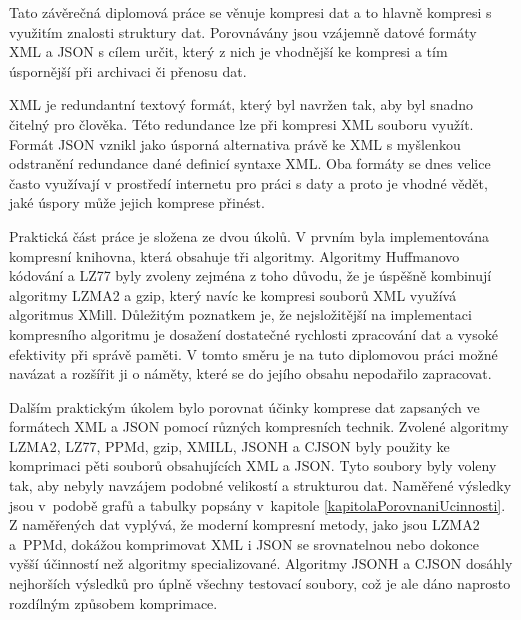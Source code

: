 

Tato závěrečná diplomová práce se věnuje kompresi dat a to hlavně kompresi s využitím znalosti struktury dat. Porovnávány jsou vzájemně datové formáty XML a JSON s cílem určit, který z nich je vhodnější ke kompresi a tím úspornější při archivaci či přenosu dat.

XML je redundantní textový formát, který byl navržen tak, aby byl snadno čitelný pro člověka. Této redundance lze při kompresi XML souboru využít. Formát JSON vznikl jako úsporná alternativa právě ke XML s myšlenkou odstranění redundance dané definicí syntaxe XML. Oba formáty se dnes velice často využívají v prostředí internetu pro práci s daty a proto je vhodné vědět, jaké úspory může jejich komprese přinést.

Praktická část práce je složena ze dvou úkolů. V prvním byla implementována kompresní knihovna, která obsahuje tři algoritmy. Algoritmy Huffmanovo kódování a LZ77 byly zvoleny zejména z toho důvodu, že je úspěšně kombinují algoritmy LZMA2 a gzip, který navíc ke kompresi souborů XML využívá algoritmus XMill. Důležitým poznatkem je, že nejsložitější na implementaci kompresního algoritmu je dosažení dostatečné rychlosti zpracování dat a vysoké efektivity při správě paměti. V tomto směru je na tuto diplomovou práci možné navázat a rozšířit ji o náměty, které se do jejího obsahu nepodařilo zapracovat.

Dalším praktickým úkolem bylo porovnat účinky komprese dat zapsaných ve formátech XML a JSON pomocí různých kompresních technik. Zvolené algoritmy LZMA2, LZ77, PPMd, gzip, XMILL, JSONH a CJSON byly použity ke komprimaci pěti souborů obsahujících XML a JSON. Tyto soubory byly voleny tak, aby nebyly navzájem podobné velikostí a strukturou dat. Naměřené výsledky jsou v~podobě grafů a tabulky popsány v~kapitole \ref{kapitolaPorovnaniUcinnosti}. Z naměřených dat vyplývá, že moderní kompresní metody, jako jsou LZMA2 a~PPMd, dokážou komprimovat XML i JSON se srovnatelnou nebo dokonce vyšší účinností než algoritmy specializované. Algoritmy JSONH a CJSON dosáhly nejhorších výsledků pro úplně všechny testovací soubory, což je ale dáno naprosto rozdílným způsobem komprimace.

